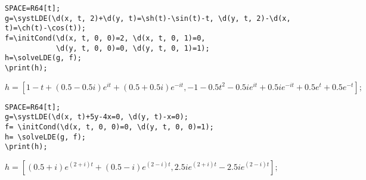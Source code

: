 \begin{verbatim}
SPACE=R64[t];
g=\systLDE(\d(x, t, 2)+\d(y, t)=\sh(t)-\sin(t)-t, \d(y, t, 2)-\d(x, t)=\ch(t)-\cos(t));
f=\initCond(\d(x, t, 0, 0)=2, \d(x, t, 0, 1)=0, 
            \d(y, t, 0, 0)=0, \d(y, t, 0, 1)=1);
h=\solveLDE(g, f); 
\print(h);
\end{verbatim}

{$h = [1-t+(0.5-0.5i)e^{it}+(0.5+0.5i)e^{-it},
-1-0.5t^{2}-0.5ie^{it}+0.5ie^{-it}+0.5e^{t}+0.5e^{-t}];$}

\begin{verbatim}
SPACE=R64[t];
g=\systLDE(\d(x, t)+5y-4x=0, \d(y, t)-x=0);
f= \initCond(\d(x, t, 0, 0)=0, \d(y, t, 0, 0)=1);
h= \solveLDE(g, f);  
\print(h);
\end{verbatim}

{$h = [(0.5+i)e^{(2+i)t}+(0.5-i)e^{(2-i)t},
2.5ie^{(2+i)t}-2.5ie^{(2-i)t}];$}

